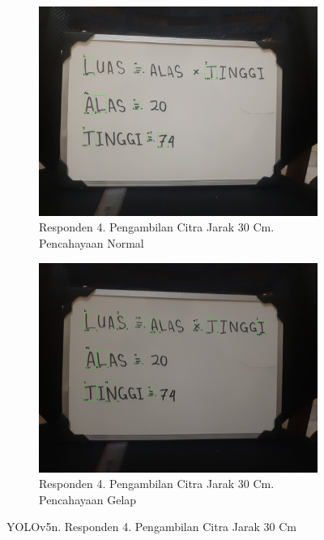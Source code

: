 \begin{figure}[H]
  \begin{subfigure}{.5\textwidth}
    \centering
    \captionsetup{width=.8\linewidth}
    \includegraphics[width=.8\linewidth]{gambar/yolov5n/responden4/hakimaxt30cm00-result.jpg}
    \caption{Responden 4. Pengambilan Citra Jarak 30 Cm. Pencahayaan Normal}
    \label{fig:nr4tcitra30cm}
  \end{subfigure}%
  \begin{subfigure}{.5\textwidth}
    \centering
    \captionsetup{width=.8\linewidth}
    \includegraphics[width=.8\linewidth]{gambar/yolov5n/responden4/hakimaxt30cm10-result.jpg}
    \caption{Responden 4. Pengambilan Citra Jarak 30 Cm. Pencahayaan Gelap}
    \label{fig:nr4gcitra30cm}
  \end{subfigure}
  \caption{YOLOv5n. Responden 4. Pengambilan Citra Jarak 30 Cm}
  \label{fig:nr4citra30cm}
\end{figure}

